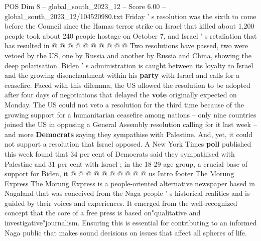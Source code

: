 \begin{textsample}{POS Dim 8 – global\_south\_2023\_12 – Score 6.00 – global\_south\_2023\_12/104520980.txt}
Friday ' s resolution was the sixth to come before the Council since the Hamas terror strike on Israel that killed about 1,200 people took about 240 people hostage on October 7, and Israel ' s retaliation that has resulted in @ @ @ @ @ @ @ @ @ @ Two resolutions have passed, two were vetoed by the US, one by Russia and another by Russia and China, showing the deep polarisation.
Biden ' s administration is caught between its loyalty to Israel and the growing disenchantment within his \textbf{party} with Israel and calls for a ceasefire.
Faced with this dilemma, the US allowed the resolution to be adopted after four days of negotiations that delayed the \textbf{vote} originally expected on Monday.
The US could not veto a resolution for the third time because of the growing support for a humanitarian ceasefire among nations -- only nine countries joined the US in opposing a General Assembly resolution calling for it last week -- and more \textbf{Democrats} saying they sympathise with Palestine.
And, yet, it could not support a resolution that Israel opposed.
A New York Times \textbf{poll} published this week found that 34 per cent of Democrats said they sympathised with Palestine and 31 per cent with Israel ; in the 18-29 age group, a crucial base of support for Biden, it @ @ @ @ @ @ @ @ @ @ us Intro footer The Morung Express The Morung Express is a people-oriented alternative newspaper based in Nagaland that was conceived from the Naga people ' s historical realities and is guided by their voices and experiences.
It emerged from the well-recognized concept that the core of a free press is based on"qualitative and investigative"journalism.
Ensuring this is essential for contributing to an informed Naga public that makes sound decisions on issues that affect all spheres of life.

\end{textsample}
